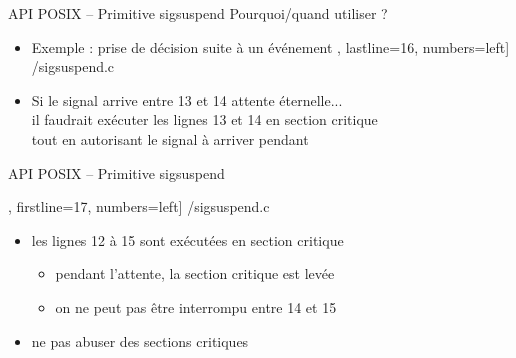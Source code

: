 \begin {frame} {API POSIX -- Primitive sigsuspend}
    Pourquoi/quand utiliser  ?

    \begin {itemize}
	\item Exemple : prise de décision suite à un événement
	    \fE\lstmonstyle, lastline=16, numbers=left] {\inc/sigsuspend.c}

	\item Si le signal arrive entre 13 et 14 \implique attente éternelle...
	    \\
	    \implique il faudrait exécuter les lignes 13 et 14 en
	    section critique
	    \\
	    tout en autorisant le signal à arriver pendant 

    \end {itemize}
\end {frame}

\begin {frame} {API POSIX -- Primitive sigsuspend}

    \fE\lstmonstyle, firstline=17, numbers=left] {\inc/sigsuspend.c}

    \begin {itemize}
	\item les lignes 12 à 15 sont exécutées en section critique
	    \begin {itemize}
		\item pendant l'attente, la section critique est levée
		\item on ne peut pas être interrompu entre 14 et 15
	    \end {itemize}
	\item ne pas abuser des sections critiques
    \end {itemize}

\end {frame}


